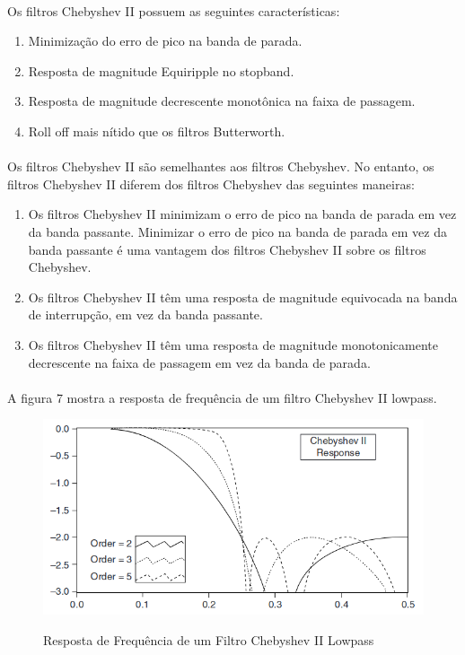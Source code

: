 \documentclass[12pt,fleqn]{article}
\begin{document}
\paragraph{} Os filtros Chebyshev II possuem as seguintes características:
\begin{enumerate}
    \item Minimização do erro de pico na banda de parada.
    \item Resposta de magnitude Equiripple no stopband.
    \item Resposta de magnitude decrescente monotônica na faixa de passagem.
    \item Roll off mais nítido que os filtros Butterworth.
\end{enumerate}

\paragraph{} Os filtros Chebyshev II são semelhantes aos filtros Chebyshev. No entanto, os filtros Chebyshev II diferem dos filtros Chebyshev das seguintes maneiras:

\begin{enumerate}
    \item Os filtros Chebyshev II minimizam o erro de pico na banda de parada em vez da banda passante. Minimizar o erro de pico na banda de parada em vez da banda passante é uma vantagem dos filtros Chebyshev II sobre os filtros Chebyshev.
    \item Os filtros Chebyshev II têm uma resposta de magnitude equivocada na banda de interrupção, em vez da banda passante.
    \item Os filtros Chebyshev II têm uma resposta de magnitude monotonicamente decrescente na faixa de passagem em vez da banda de parada.
\end{enumerate}

\newpage
\paragraph{} A figura 7 mostra a resposta de frequência de um filtro Chebyshev II lowpass.

\begin{figure}[!htb]
    \centering
    \includegraphics[scale=0.6]{fig/figura7.png}
    \label{figura:figura3}
    \caption{Resposta de Frequência de um Filtro Chebyshev II Lowpass}
\end{figure}
\end{document}
